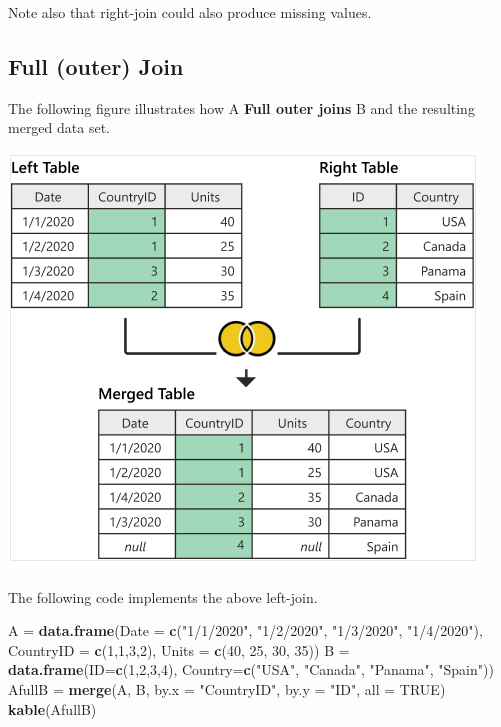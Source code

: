 \documentclass[
]{book}
\newenvironment{Shaded}{\begin{snugshade}}{\end{snugshade}}
\newcommand{\AttributeTok}[1]{\textcolor[rgb]{0.13,0.29,0.53}{#1}}
\newcommand{\ConstantTok}[1]{\textcolor[rgb]{0.56,0.35,0.01}{#1}}
\newcommand{\DecValTok}[1]{\textcolor[rgb]{0.00,0.00,0.81}{#1}}
\newcommand{\FunctionTok}[1]{\textcolor[rgb]{0.13,0.29,0.53}{\textbf{#1}}}
\newcommand{\NormalTok}[1]{#1}
\newcommand{\OtherTok}[1]{\textcolor[rgb]{0.56,0.35,0.01}{#1}}
\newcommand{\StringTok}[1]{\textcolor[rgb]{0.31,0.60,0.02}{#1}}
\begin{document}
Note also that right-join could also produce missing values.

\hfill\break

\hypertarget{full-outer-join}{%
\subsection{Full (outer) Join}\label{full-outer-join}}

The following figure illustrates how A \textbf{Full outer joins} B and the resulting merged data set.

\begin{center}\includegraphics[width=0.7\linewidth]{img05/w5-fullOuterJoin} \end{center}

The following code implements the above left-join.

\begin{Shaded}
\begin{Highlighting}[]
\NormalTok{A }\OtherTok{=} \FunctionTok{data.frame}\NormalTok{(}\AttributeTok{Date =} \FunctionTok{c}\NormalTok{(}\StringTok{"1/1/2020"}\NormalTok{, }\StringTok{"1/2/2020"}\NormalTok{, }\StringTok{"1/3/2020"}\NormalTok{, }\StringTok{"1/4/2020"}\NormalTok{),}
               \AttributeTok{CountryID =} \FunctionTok{c}\NormalTok{(}\DecValTok{1}\NormalTok{,}\DecValTok{1}\NormalTok{,}\DecValTok{3}\NormalTok{,}\DecValTok{2}\NormalTok{),}
               \AttributeTok{Units =} \FunctionTok{c}\NormalTok{(}\DecValTok{40}\NormalTok{, }\DecValTok{25}\NormalTok{, }\DecValTok{30}\NormalTok{, }\DecValTok{35}\NormalTok{))}
\NormalTok{B }\OtherTok{=} \FunctionTok{data.frame}\NormalTok{(}\AttributeTok{ID=}\FunctionTok{c}\NormalTok{(}\DecValTok{1}\NormalTok{,}\DecValTok{2}\NormalTok{,}\DecValTok{3}\NormalTok{,}\DecValTok{4}\NormalTok{),}
               \AttributeTok{Country=}\FunctionTok{c}\NormalTok{(}\StringTok{"USA"}\NormalTok{, }\StringTok{"Canada"}\NormalTok{, }\StringTok{"Panama"}\NormalTok{, }\StringTok{"Spain"}\NormalTok{))}
\NormalTok{AfullB }\OtherTok{=} \FunctionTok{merge}\NormalTok{(A, B, }\AttributeTok{by.x =} \StringTok{"CountryID"}\NormalTok{, }\AttributeTok{by.y =} \StringTok{"ID"}\NormalTok{, }\AttributeTok{all =} \ConstantTok{TRUE}\NormalTok{)}
\FunctionTok{kable}\NormalTok{(AfullB)}
\end{Highlighting}
\end{Shaded}
\end{document}
